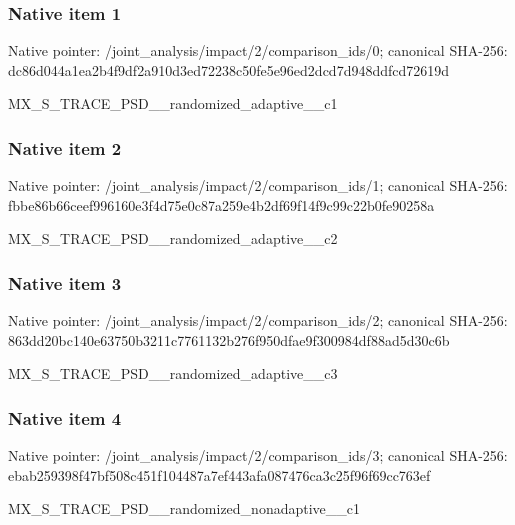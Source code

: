 \documentclass[10pt,a4paper]{article}
\begin{document}
\subsubsection{Native item 1}
Native pointer: /joint\_\allowbreak{}analysis/impact/2/comparison\_\allowbreak{}ids/0; canonical SHA-256: dc86d044a1ea2b4f9df2a910d3ed72238c50fe5e96ed2dcd7d948ddfcd72619d

\begingroup\raggedright\sloppy MX\_\allowbreak{}S\_\allowbreak{}TRACE\_\allowbreak{}PSD\_\allowbreak{}\_\allowbreak{}randomized\_\allowbreak{}adaptive\_\allowbreak{}\_\allowbreak{}c1\par\endgroup

\subsubsection{Native item 2}
Native pointer: /joint\_\allowbreak{}analysis/impact/2/comparison\_\allowbreak{}ids/1; canonical SHA-256: fbbe86b66ceef996160e3f4d75e0c87a259e4b2df69f14f9c99c22b0fe90258a

\begingroup\raggedright\sloppy MX\_\allowbreak{}S\_\allowbreak{}TRACE\_\allowbreak{}PSD\_\allowbreak{}\_\allowbreak{}randomized\_\allowbreak{}adaptive\_\allowbreak{}\_\allowbreak{}c2\par\endgroup

\subsubsection{Native item 3}
Native pointer: /joint\_\allowbreak{}analysis/impact/2/comparison\_\allowbreak{}ids/2; canonical SHA-256: 863dd20bc140e63750b3211c7761132b276f950dfae9f300984df88ad5d30c6b

\begingroup\raggedright\sloppy MX\_\allowbreak{}S\_\allowbreak{}TRACE\_\allowbreak{}PSD\_\allowbreak{}\_\allowbreak{}randomized\_\allowbreak{}adaptive\_\allowbreak{}\_\allowbreak{}c3\par\endgroup

\subsubsection{Native item 4}
Native pointer: /joint\_\allowbreak{}analysis/impact/2/comparison\_\allowbreak{}ids/3; canonical SHA-256: ebab259398f47bf508c451f104487a7ef443afa087476ca3c25f96f69cc763ef

\begingroup\raggedright\sloppy MX\_\allowbreak{}S\_\allowbreak{}TRACE\_\allowbreak{}PSD\_\allowbreak{}\_\allowbreak{}randomized\_\allowbreak{}nonadaptive\_\allowbreak{}\_\allowbreak{}c1\par\endgroup
\end{document}
